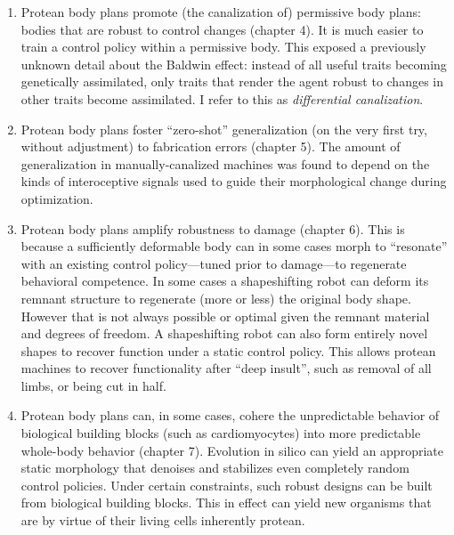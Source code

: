 \begin{enumerate}
    \item Protean body plans promote (the canalization of) permissive body plans:
    bodies that are robust to control changes (chapter 4).
    It is much easier to train a control policy within a permissive body. 
    This exposed a previously unknown detail about the Baldwin effect: instead of all useful traits becoming genetically assimilated, only traits that render the agent robust to changes in other traits become assimilated. 
    I refer to this as \textit{differential canalization}.
    
    \item Protean body plans foster ``zero-shot'' generalization (on the very first try, without adjustment) to fabrication errors (chapter 5).
    The amount of generalization in manually-canalized machines was found to depend on the kinds of interoceptive signals used to guide their morphological change during optimization.
    
    \item Protean body plans amplify robustness to damage (chapter 6).
    This is because a sufficiently deformable body can in some cases morph to ``resonate'' with an existing control policy---tuned prior to damage---to regenerate behavioral competence.
    In some cases a shapeshifting robot can deform its remnant structure to regenerate (more or less) the original body shape.
    However that is not always possible or optimal given the remnant material and degrees of freedom.
    A shapeshifting robot can also form entirely novel shapes to recover function under a static control policy.
    This allows protean machines to recover functionality after ``deep insult'', such as removal of all limbs, or being cut in half.
    
    \item Protean body plans 
    can, in some cases, cohere the unpredictable behavior of biological building blocks (such as cardiomyocytes) into more predictable whole-body behavior (chapter 7).
    Evolution in silico can yield an appropriate static morphology that denoises and stabilizes even completely random control policies.
    Under certain constraints, such robust designs can be built from biological building blocks.
    This in effect can yield new organisms that are by virtue of their living cells inherently protean.
    

\end{enumerate}

